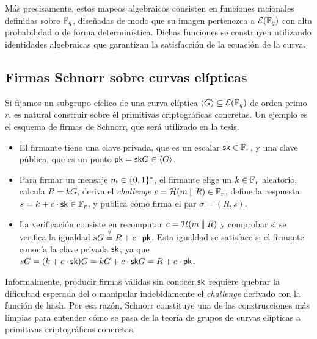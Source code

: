 Más precisamente, estos mapeos algebraicos consisten en funciones racionales definidas sobre $\mathbb{F}_q$, diseñadas de modo que su imagen pertenezca a $\mathcal{E}(\mathbb{F}_q)$ con alta probabilidad o de forma determinística. Dichas funciones se construyen utilizando identidades algebraicas que garantizan la satisfacción de la ecuación de la curva.

\subsection{Firmas Schnorr sobre curvas elípticas}
\label{subsec:apendice-a-hashes-firmas-schnorr-sobre-curvas-elipticas}

Si fijamos un subgrupo cíclico de una curva elíptica $\left\langle G \right\rangle \subseteq \mathcal{E}(\mathbb{F}_q)$ de orden primo $r$, es natural construir sobre él primitivas criptográficas concretas. Un ejemplo es el esquema de firmas de Schnorr, que será utilizado en la tesis.

\begin{itemize}[itemsep=0.1 cm]
	\item El firmante tiene una clave privada, que es un escalar $\mathsf{sk} \in \mathbb{F}_r$, y una clave pública, que es un punto $\mathsf{pk} = \mathsf{sk} G \in \left\langle G \right\rangle$.
	\item Para firmar un mensaje $m \in \{0,1\}^{*}$, el firmante elige un $k \in \mathbb{F}_r$ aleatorio, calcula
	$R = kG$, deriva el \textit{challenge} $c = \mathcal{H}(m \mathbin{\|} R) \in \mathbb{F}_r$, define la respuesta $s = k + c \cdot \mathsf{sk} \in \mathbb{F}_r$, y publica como firma el par $\sigma = (R,s)$.
	\item La verificación consiste en recomputar $c = \mathcal{H}(m \mathbin{\|} R)$ y comprobar si se verifica la igualdad $sG \stackrel{?}{=} R + c\cdot \mathsf{pk}$. Esta igualdad se satisface si el firmante conocía la clave privada $\mathsf{sk}$, ya que $sG = (k + c \cdot \mathsf{sk})G = kG + c \cdot \mathsf{sk} G = R + c \cdot \mathsf{pk}$.
\end{itemize}

Informalmente, producir firmas válidas sin conocer $\mathsf{sk}$ requiere quebrar la dificultad esperada del \ECDLP o manipular indebidamente el \textit{challenge} derivado con la función de hash. Por esa razón, Schnorr constituye una de las construcciones más limpias para entender cómo se pasa de la teoría de grupos de curvas elípticas a primitivas criptográficas concretas.
